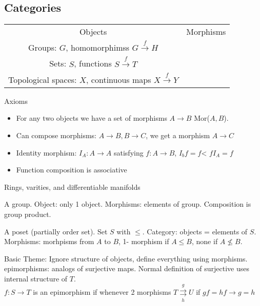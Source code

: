 
\subsection{Categories}

\begin{example}
    \begin{tabular}{c c}
        Objects & Morphisms \\
        Groups: $G$, homomorphimss $G \stackrel{f}{\to} H$ \\
        Sets: $S$, functions $S \stackrel{f}{\to} T$ \\
        Topological spaces: $X$, continuous maps $X \stackrel{f}{\to} Y$ 
    \end{tabular}
\end{example}

\noindent
Axioms 
\begin{itemize}
    \item For any two objects we have a set of morphisms $A \to B$ Mor($A,B$). 
    \item Can compose morphisms: $A \to B, B \to C$, we get a morphism $A \to C$ \\
    \item Identity morphism: $I_A: A \to A$ satisfying $f: A \to B$, $I_bf = f$< $fI_A = f$ 
    \item Function composition is associative
\end{itemize}

\begin{example}
    Rings, varities, and differentiable manifolds
\end{example}

\begin{example}
    A group. Object: only 1 object. Morphisms: elements of group. Composition is group product. 
\end{example}

\begin{example}
    A poset (partially order set). Set $S$ with $\le$. Category: objects = elements of $S$. Morphisms: morhpisms from $A$ to $B$, 1- morphism if $A \le B$, none if $A \not\le B$. 
\end{example}

\noindent
Basic Theme: Ignore structure of objects, define everything using morphisms. \\
epimorphisms: analogs of surjective maps. Normal definition of surjective uses internal structure of $T$. \\
$f: S \to T$ is an epimorphism if whenever 2 morphisms $T \overset{g}{\underset{h}{\rightrightarrows}} U$ if $gf = hf \to g = h$ 

